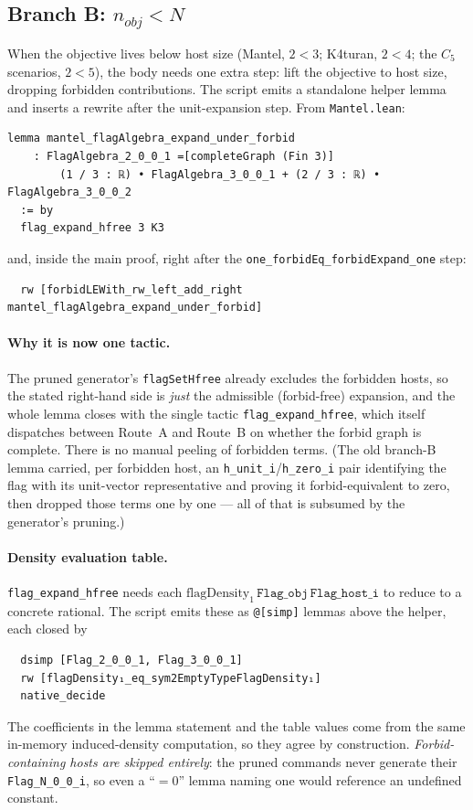 \documentclass[11pt]{article}
\begin{document}
\subsection{Branch B: $n_{\mathit{obj}} < N$}

When the objective lives below host size (Mantel, $2<3$; K4turan, $2<4$; the
$C_5$ scenarios, $2<5$), the body needs one extra step: lift the objective to
host size, dropping forbidden contributions. The script emits a standalone helper
lemma and inserts a rewrite after the unit-expansion step. From
\texttt{Mantel.lean}:
\begin{lstlisting}
lemma mantel_flagAlgebra_expand_under_forbid
    : FlagAlgebra_2_0_0_1 =[completeGraph (Fin 3)]
        (1 / 3 : ℝ) • FlagAlgebra_3_0_0_1 + (2 / 3 : ℝ) • FlagAlgebra_3_0_0_2
  := by
  flag_expand_hfree 3 K3
\end{lstlisting}
and, inside the main proof, right after the
\texttt{one\_forbidEq\_forbidExpand\_one} step:
\begin{lstlisting}
  rw [forbidLEWith_rw_left_add_right mantel_flagAlgebra_expand_under_forbid]
\end{lstlisting}

\paragraph{Why it is now one tactic.}
The pruned generator's \texttt{flagSetHfree} already excludes the forbidden
hosts, so the stated right-hand side is \emph{just} the admissible (forbid-free)
expansion, and the whole lemma closes with the single tactic
\texttt{flag\_expand\_hfree}, which itself dispatches between Route~A and
Route~B on whether the forbid graph is complete. There is no manual
peeling of forbidden terms. (The old branch-B lemma carried, per forbidden host,
an \texttt{h\_unit\_i}/\texttt{h\_zero\_i} pair identifying the flag with its
unit-vector representative and proving it forbid-equivalent to zero, then dropped
those terms one by one --- all of that is subsumed by the generator's pruning.)

\paragraph{Density evaluation table.}
\texttt{flag\_expand\_hfree} needs each
$\mathrm{flagDensity}_1\,\texttt{Flag\_obj}\,\texttt{Flag\_host\_i}$ to reduce to
a concrete rational. The script emits these as \texttt{@[simp]} lemmas above the
helper, each closed by
\begin{lstlisting}
  dsimp [Flag_2_0_0_1, Flag_3_0_0_1]
  rw [flagDensity₁_eq_sym2EmptyTypeFlagDensity₁]
  native_decide
\end{lstlisting}
The coefficients in the lemma statement and the table values come from the same
in-memory induced-density computation, so they agree by construction.
\emph{Forbid-containing hosts are skipped entirely}: the pruned commands never
generate their \texttt{Flag\_N\_0\_0\_i}, so even a ``$=0$'' lemma naming one
would reference an undefined constant.
\end{document}
